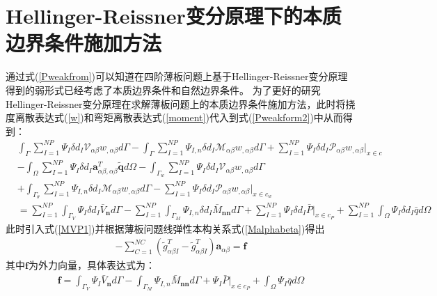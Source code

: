 \section{Hellinger-Reissner变分原理下的本质边界条件施加方法}
通过式(\ref{Pweakfrom})可以知道在四阶薄板问题上基于Hellinger-Reissner变分原理得到的弱形式已经考虑了本质边界条件和自然边界条件。
为了更好的研究Hellinger-Reissner变分原理在求解薄板问题上的本质边界条件施加方法，此时将挠度离散表达式(\ref{w})和弯矩离散表达式(\ref{moment})代入到式(\ref{Pweakform2})中从而得到：
\begin{equation}
\begin{split}
    &\int_{\Gamma}\sum_{I=1}^{N\!P}\Psi_I\delta{d_I}\mathcal{V}_{\alpha\beta}w_{,\alpha\beta}d\Gamma-\int_{\Gamma}\sum_{I=1}^{N\!P}\Psi_{I,n}\delta{d_I}\mathcal{M}_{\alpha\beta}w_{,\alpha\beta}d\Gamma+\sum_{I=1}^{N\!P}\Psi_I\delta{d_I}\mathcal{P}_{\alpha\beta}w_{,\alpha\beta}\vert_{x\in c}\\
    &-\int_{\Omega}\sum_{I=1}^{N\!P}\Psi_I\delta{d_I}\pmb{a}^T_{\alpha\beta,\alpha\beta}\tilde{\pmb q}d\Omega-\int_{\Gamma_w}\sum_{I=1}^{N\!P}\Psi_I\delta{d_I}\mathcal{V}_{\alpha\beta}w_{,\alpha\beta}d\Gamma\\
    &+\int_{\Gamma_{\theta}}\sum_{I=1}^{N\!P}\Psi_{I,n}\delta{d_I}\mathcal{M}_{\alpha\beta}w_{,\alpha\beta}d\Gamma
    -\sum_{I=1}^{N\!P}\Psi_I\delta{d_I}\mathcal{P}_{\alpha\beta}w_{,\alpha\beta}\vert_{x\in c_w}\\
    &=\sum_{I=1}^{N\!P}\int_{\Gamma_V}\Psi_I\delta{d_I}\bar{V}_{\pmb n}d\Gamma-\sum_{I=1}^{N\!P}\int_{\Gamma_M}\Psi_{I,n}\delta{d_I}\bar{M}_{\pmb{nn}}d\Gamma+\sum_{I=1}^{N\!P}\Psi_I\delta{d_I}\bar{P}\vert_{x\in{c_P}}+\sum_{I=1}^{N\!P}\int_{\Omega}\Psi_I\delta{d_I}\bar{q}d\Omega
\end{split}
\end{equation}
此时引入式(\ref{MVP1})并根据薄板问题线弹性本构关系式(\ref{Malphabeta})得出
\begin{equation}\label{2}
\begin{split}
  -\sum_{C=1}^{N\!C}(\tilde{g}_{\alpha\beta I}^T-\tilde{g}_{\alpha\beta I}^T)\pmb a_{\alpha\beta}=\pmb{f}
\end{split}
\end{equation}
其中$\pmb{f}$为外力向量，具体表达式为：
\begin{equation}
\begin{split}
    \pmb{f}=\int_{\Gamma_V}\Psi_I\bar{V}_{\pmb n}d\Gamma-\int_{\Gamma_M}\Psi_{I,n}\bar{M}_{\pmb{nn}}d\Gamma+\Psi_I\bar{P}\vert_{x\in{c_P}}+\int_{\Omega}\Psi_I\bar{q}d\Omega
\end{split}
\end{equation}
